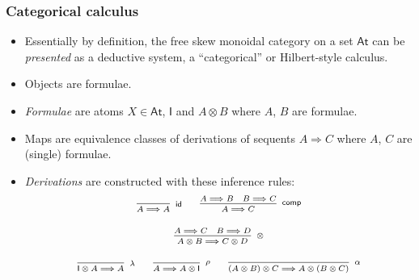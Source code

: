 \documentclass[10pt,t]{beamer}
\newcommand{\I}{\mathsf{I}}
\newcommand{\ot}{\otimes}
\newcommand{\al}{\alpha}
\newcommand{\lam}{\lambda}
\newcommand{\Var}{\mathsf{At}}
\newcommand{\tto}{\Longrightarrow}
\newcommand{\id}{\mathsf{id}}
\newcommand{\dcomp}{\mathsf{comp}}
\begin{document}
\begin{frame}

  \frametitle{Categorical calculus}

\begin{itemize}

\item Essentially by definition, the free skew monoidal category on a
  set $\Var$ can be \emph{presented} as a deductive system, a ``categorical''
  or Hilbert-style calculus.

\medskip

\item Objects are formulae. 

\item \emph{Formulae} are atoms $X \in \Var$, $\I$ and $A \ot B$ where
  $A$, $B$ are formulae.

\medskip

\item Maps are equivalence classes of derivations of sequents
  $A \tto C$ where $A$, $C$ are (single) formulae.

\item \emph{Derivations} are constructed with these inference rules:
\[
\scriptsize
\begin{array}{c}
\infer[\id]{A \tto A}{}
\qquad
\infer[\dcomp]{A \tto C}{A \tto B & B \tto C}
\\[12pt]
\infer[\ot]{A \ot B \tto C \ot D}{A \tto C & B \tto D}
\\[12pt]
\infer[\lam]{\I \ot A \tto A}{}
\qquad
\infer[\rho]{A \tto A \ot \I}{}
\qquad
\infer[\al]{(A \ot B) \ot C \tto A \ot (B \ot C)}{}
\end{array}
\]

\end{itemize}


\end{frame}
\end{document}
